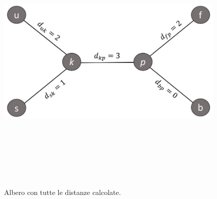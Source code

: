 \begin{figure}[h!]
\centering
	\includegraphics[height=13cm, width=11cm, keepaspectratio]{distance_between_s_u_part_4.jpg}
 	\caption{Albero con tutte le distanze calcolate.}
  	\label{fig:neighborsleaves_4}
\end{figure}